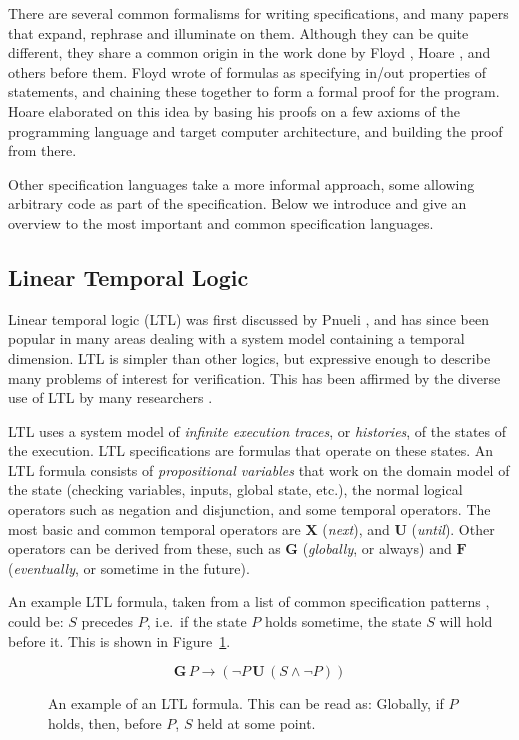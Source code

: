 There are several common formalisms for writing specifications, and many papers
that expand, rephrase and illuminate on them. Although they can be quite
different, they share a common origin in the work done by Floyd \cite{floyd67},
Hoare \cite{hoare69}, and others before them. Floyd wrote of formulas as
specifying in/out properties of statements, and chaining these together to form
a formal proof for the program. Hoare elaborated on this idea by basing his
proofs on a few axioms of the programming language and target computer
architecture, and building the proof from there.

Other specification languages take a more informal approach, some allowing
arbitrary code as part of the specification. Below we introduce and give an
overview to the most important and common specification languages.


\subsection{Linear Temporal Logic} \label{section-ltl}

Linear temporal logic (LTL) was first discussed by Pnueli \cite{pnueli77}, and
has since been popular in many areas dealing with a system model containing a
temporal dimension. LTL is simpler than other logics, but expressive enough to
describe many problems of interest for verification. This has been affirmed by
the diverse use of LTL by many researchers \cite{pnueli77}.

LTL uses a system model of \textit{infinite execution traces}, or
\textit{histories}, of the states of the execution. LTL specifications are
formulas that operate on these states. An LTL formula consists of
\textit{propositional variables} that work on the domain model of the state
(checking variables, inputs, global state, etc.), the normal logical operators
such as negation and disjunction, and some temporal operators. The most basic
and common temporal operators are $\boldsymbol{X}$ (\textit{next}), and
$\boldsymbol{U}$ (\textit{until}). Other operators can be derived from these,
such as $\boldsymbol{G}$ (\textit{globally}, or always) and $\boldsymbol{F}$
(\textit{eventually}, or sometime in the future).

An example LTL formula, taken from a list of common specification patterns
\cite{dwyer99patterns}, could be: $S$ precedes $P$, i.e.\ if the state $P$
holds sometime, the state $S$ will hold before it. This is shown in
Figure~\ref{figure-ltl}.

\begin{figure}[h!]
	\[
	\boldsymbol{G} \, P \rightarrow (\neg P \, \boldsymbol{U} \, (S \wedge \neg P))
	\]

	\caption{An example of an LTL formula. This can be read as: Globally, if $P$
	holds, then, before $P$, $S$ held at some point.}
	\label{figure-ltl}
\end{figure}


